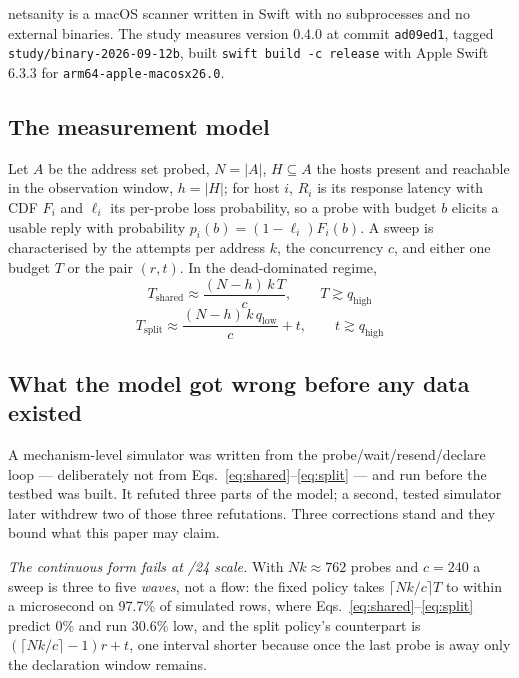 \documentclass[conference]{IEEEtran}
\newcommand{\netsanity}{\textsf{netsanity}}
\newcommand{\qhigh}{q_{\mathrm{high}}}
\newcommand{\qlow}{q_{\mathrm{low}}}
\begin{document}
\netsanity{} is a macOS scanner written in Swift with no subprocesses and no
external binaries. The study measures version 0.4.0 at commit
\texttt{ad09ed1}, tagged \texttt{study/bi\-nary-2026-09-12b}, built
\texttt{swift build -c release} with Apple Swift 6.3.3 for
\texttt{arm64-apple-macosx26.0}.

\subsection{The measurement model}
Let $A$ be the address set probed, $N=|A|$, $H\subseteq A$ the hosts present
and reachable in the observation window, $h=|H|$; for host $i$, $R_i$ is its
response latency with CDF $F_i$ and $\ell_i$ its per-probe loss probability, so
a probe with budget $b$ elicits a usable reply with probability
$p_i(b)=(1-\ell_i)F_i(b)$. A sweep is characterised by the attempts per address
$k$, the concurrency $c$, and either one budget $T$ or the pair $(r,t)$. In the
dead-dominated regime,
\begin{equation}
T_{\mathrm{shared}} \approx \frac{(N-h)\,k\,T}{c},\qquad T \gtrsim \qhigh
\label{eq:shared}
\end{equation}
\begin{equation}
T_{\mathrm{split}} \approx \frac{(N-h)\,k\,\qlow}{c} + t,\qquad t \gtrsim \qhigh
\label{eq:split}
\end{equation}

\subsection{What the model got wrong before any data existed}
\label{sec:sim}
A mechanism-level simulator was written from the probe/wait/resend/declare loop
--- deliberately not from Eqs.~\ref{eq:shared}--\ref{eq:split} --- and run
before the testbed was built. It refuted three parts of the model; a second,
tested simulator later withdrew two of those three refutations. Three
corrections stand and they bound what this paper may claim.

\emph{The continuous form fails at /24 scale.} With $Nk\approx762$ probes and
$c=240$ a sweep is three to five \emph{waves}, not a flow: the fixed policy
takes $\lceil Nk/c\rceil T$ to within a microsecond on 97.7\% of simulated
rows, where Eqs.~\ref{eq:shared}--\ref{eq:split} predict 0\% and run 30.6\%
low, and the split policy's counterpart is $(\lceil Nk/c\rceil-1)r+t$, one
interval shorter because once the last probe is away only the declaration
window remains.
\end{document}
